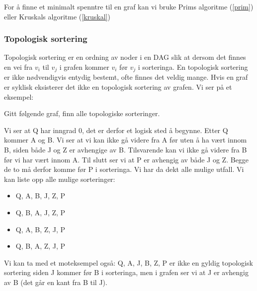 For å finne et minimalt spenntre til en graf kan vi bruke Prims algoritme (\ref{prim}) eller Kruskals algoritme (\ref{kruskal})


\subsubsection{Topologisk sortering}
Topologisk sortering er en ordning av noder i en DAG slik at dersom det finnes en vei fra $ v_i $ til $ v_j $ i grafen kommer $ v_i $ før $ v_j $ i sorteringa. En topologisk sortering er ikke nødvendigvis entydig bestemt, ofte finnes det veldig mange. Hvis en graf er syklisk eksisterer det ikke en topologisk sortering av grafen. Vi ser på et eksempel: 

\begin{eks} Gitt følgende graf, finn alle topologiske sorteringer.
\begin{figure}[H]
\centering
{}
\end{figure}

Vi ser at Q har inngrad 0, det er derfor et logisk sted å begynne. Etter Q kommer A og B. Vi ser at vi kan ikke gå videre fra A før uten å ha vært innom B, siden både J og Z er avhengige av B. Tilsvarende kan vi ikke gå videre fra B før vi har vært innom A. Til slutt ser vi at P er avhengig av både J og Z. Begge de to må derfor komme før P i sorteringa. Vi har da dekt alle mulige utfall. Vi kan liste opp alle mulige sorteringer:
\begin{itemize}
\item Q, A, B, J, Z, P
\item Q, B, A, J, Z, P
\item Q, A, B, Z, J, P
\item Q, B, A, Z, J, P
\end{itemize}

Vi kan ta med et moteksempel også: Q, A, J, B, Z, P er ikke en gyldig topologisk sortering siden J kommer før B i sorteringa, men i grafen ser vi at J er avhengig av B (det går en kant fra B til J).
\end{eks}



